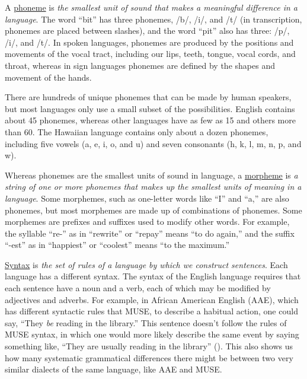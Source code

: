\documentclass[
]{krantz}
\begin{document}
A \hyperref[phoneme]{phoneme} is \emph{the smallest unit of sound that makes a meaningful difference in a language}. The word ``bit'' has three phonemes, /b/, /i/, and /t/ (in transcription, phonemes are placed between slashes), and the word ``pit'' also has three: /p/, /i/, and /t/. In spoken languages, phonemes are produced by the positions and movements of the vocal tract, including our lips, teeth, tongue, vocal cords, and throat, whereas in sign languages phonemes are defined by the shapes and movement of the hands.

There are hundreds of unique phonemes that can be made by human speakers, but most languages only use a small subset of the possibilities. English contains about 45 phonemes, whereas other languages have as few as 15 and others more than 60. The Hawaiian language contains only about a dozen phonemes, including five vowels (a, e, i, o, and u) and seven consonants (h, k, l, m, n, p, and w).

Whereas phonemes are the smallest units of sound in language, a \hyperref[morpheme]{morpheme} is \emph{a string of one or more phonemes that makes up the smallest units of meaning in a language}. Some morphemes, such as one-letter words like ``I'' and ``a,'' are also phonemes, but most morphemes are made up of combinations of phonemes. Some morphemes are prefixes and suffixes used to modify other words. For example, the syllable ``re-'' as in ``rewrite'' or ``repay'' means ``to do again,'' and the suffix ``-est'' as in ``happiest'' or ``coolest'' means ``to the maximum.''

\hyperref[syntax]{Syntax} is \emph{the set of rules of a language by which we construct sentences}. Each language has a different syntax. The syntax of the English language requires that each sentence have a noun and a verb, each of which may be modified by adjectives and adverbs. For example, in African American English (AAE), which has different syntactic rules that MUSE, to describe a habitual action, one could say, ``They \emph{be} reading in the library.'' This sentence doesn't follow the rules of MUSE syntax, in which one would more likely describe the same event by saying something like, ``They are usually reading in the library'' (). This also shows us how many systematic grammatical differences there might be between two very similar dialects of the same language, like AAE and MUSE.
\end{document}
